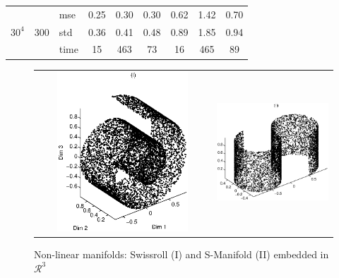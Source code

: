 \documentclass{article} %
\begin{document}
\begin{table}[t]
\begin{center}
\begin{small}
\begin{sc}
\begin{tabular}{lllcccccc}
\\
\multirow{3}{*}{$30^4$}&\multirow{3}{*}{300}&mse&0.25&0.30&0.30&0.62&1.42&0.70\\
&&std &0.36&0.41&0.48&0.89&1.85&0.94\\
&&time &15&463&73&16&465&89\\

\hline
\end{tabular}
\end{sc}
\end{small}
\end{center}
\vskip -0.1in
\end{table}


\begin{figure}
\centering
\begin{tabular}{cc}
\includegraphics[width=90mm,height=60mm]{Swissroll.eps} & \includegraphics[width=60mm,height=60mm]{SManifold.eps}
\end{tabular}
\caption{Non-linear manifolds: Swissroll (I) and S-Manifold (II) embedded in $\mathcal{R}^3$} \label{manifold:nonlinear}
\end{figure}
\end{document}
